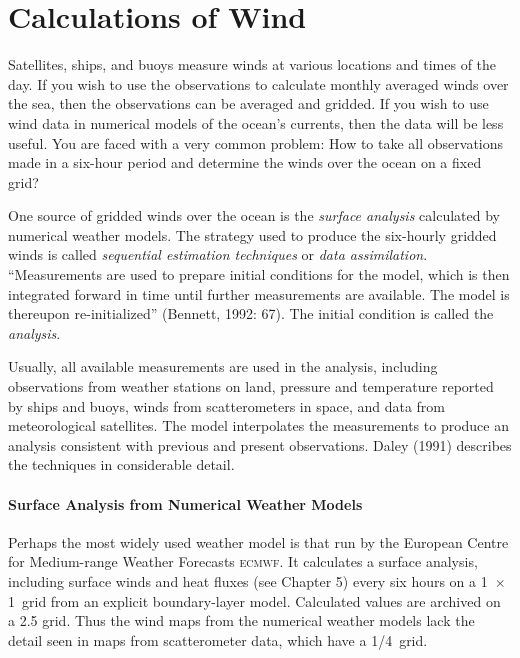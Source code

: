 \section{Calculations of Wind}
Satellites, ships,
and buoys measure winds at various locations and times of the day. If
you wish to use the observations to calculate monthly averaged winds
over the sea, then the observations can be averaged and gridded. If
you wish to use wind data in numerical models of the ocean's currents,
then the data will be less useful. You are faced with a very common
problem: How to take all observations made in a six-hour period and
determine the winds over the ocean on a fixed grid?

One source of gridded winds over the ocean is the \textit{surface
  analysis} calculated by numerical
weather models. The strategy
used to produce the six-hourly gridded winds is called
\textit{sequential estimation techniques} or \textit{data assimilation}. ``Measurements are used to prepare initial
conditions for the model, which is then integrated forward in time
until further measurements are available. The model is thereupon
re-initialized'' (Bennett, 1992: 67). The initial condition is called
the \textit{analysis}.

Usually, all available measurements are used in the analysis,
including observations from weather stations on land, pressure and
temperature reported by ships and buoys, winds from
scatterometers
in space, and data from meteorological satellites. The model
interpolates the measurements to produce an analysis consistent with
previous and present observations. Daley (1991) describes the
techniques in considerable detail.

\paragraph{Surface Analysis from Numerical Weather Models}
Perhaps the most widely used weather model is that run by the European
Centre for Medium-range Weather Forecasts \textsc{ecmwf}. It
calculates a surface analysis, including
surface winds and heat fluxes (see Chapter 5) every
six hours on a 1\degrees\ $ \times $ 1\degrees\ grid from an explicit
boundary-layer model. Calculated values are archived on a 2.5\degrees
grid. Thus the wind maps from the numerical weather models lack the
detail seen in maps from scatterometer data, which have a
1/4\degrees\ grid.

